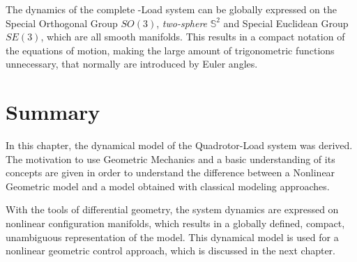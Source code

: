 The dynamics of the complete -Load system can be globally expressed on the Special Orthogonal Group $SO(3)$, \textit{two-sphere} $ \mathbb{S}^2 $ and Special Euclidean Group $ SE(3) $, which are all smooth  manifolds. This results in a compact notation of the equations of motion, making the large amount of trigonometric functions unnecessary, that normally are introduced by Euler angles.


\section*{Summary}
In this chapter, the dynamical model of the Quadrotor-Load system was derived.
The motivation to use Geometric Mechanics and a basic understanding of its concepts are given in order to understand the difference between a Nonlinear Geometric model and a model obtained with classical modeling approaches.

With the tools of differential geometry, the system dynamics are expressed on nonlinear configuration manifolds, which results in a globally defined, compact, unambiguous representation of the model. This dynamical model is used for a nonlinear geometric control approach, which is discussed in the next chapter.
